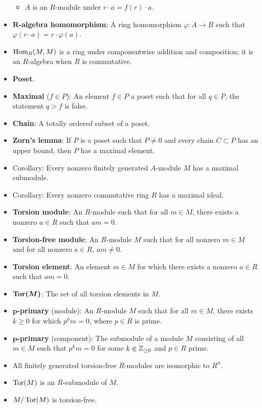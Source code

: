 \documentclass[../notes.tex]{subfiles}
\begin{document}
\begin{itemize}
    \begin{itemize}
        \item $A$ is an $R$-module under $r\cdot a=f(r)\cdot a$.
    \end{itemize}
    \item \textbf{$\bm{R}$-algebra homomorphism}: A ring homomorphism $\varphi:A\to B$ such that $\varphi(r\cdot a)=r\cdot\varphi(a)$.
    \item $\operatorname{Hom}_R(M,M)$ is a ring under componentwise addition and composition; it is an $R$-algebra when $R$ is commutative.
    \item \textbf{Poset}.
    \item \textbf{Maximal} ($f\in P$): An element $f\in P$ a poset such that for all $q\in P$, the statement $q>f$ is false.
    \item \textbf{Chain}: A totally ordered subset of a poset.
    \item \textbf{Zorn's lemma}: If $P$ is a poset such that $P\neq 0$ and every chain $C\subset P$ has an upper bound, then $P$ has a maximal element.
    \item Corollary: Every nonzero finitely generated $A$-module $M$ has a maximal submodule.
    \item Corollary: Every nonzero commutative ring $R$ has a maximal ideal.
    \item \textbf{Torsion module}: An $R$-module such that for all $m\in M$, there exists a nonzero $a\in R$ such that $am=0$.
    \item \textbf{Torsion-free module}: An $R$-module $M$ such that for all nonzero $m\in M$ and for all nonzero $a\in R$, $am\neq 0$.
    \item \textbf{Torsion element}: An element $m\in M$ for which there exists a nonzero $a\in R$ such that $am=0$.
    \item $\bm{\Tor(M)}$: The set of all torsion elements in $M$.
    \item \textbf{$\bm{p}$-primary} (module): An $R$-module $M$ such that for all $m\in M$, there exists $k\geq 0$ for which $p^km=0$, where $p\in R$ is prime.
    \item \textbf{$\bm{p}$-primary} (component): The submodule of a module $M$ consisting of all $m\in M$ such that $p^km=0$ for some $k\in{\mathbb{Z}_{\geq 0}}$ and $p\in R$ prime.
    \item All finitely generated torsion-free $R$-modules are isomorphic to $R^n$.
    \item $\operatorname{Tor}(M)$ is an $R$-submodule of $M$.
    \item $M/\operatorname{Tor}(M)$ is torsion-free.

\end{itemize}
\end{document}
